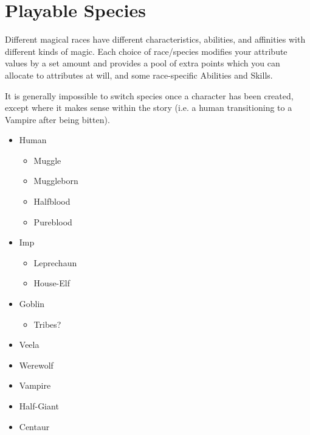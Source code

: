 
\chapter{Playable Species} \label{C:Species}
 
 Different magical races have different characteristics, abilities, and affinities with different kinds of magic. Each choice of race/species modifies your attribute values by a set amount and provides a pool of extra points which you can allocate to attributes at will, and some race-specific Abilities and Skills. 
 
It is generally impossible to switch species once a character has been created, except where it makes sense within the story (i.e. a human transitioning to a Vampire after being bitten). 

\begin{itemize}
	\item Human
	\begin{itemize}
		\item Muggle
		\item Muggleborn
		\item Halfblood
		\item Pureblood
	\end{itemize}
	\item Imp
	\begin{itemize}
		\item Leprechaun
		\item House-Elf
	\end{itemize}
	\item Goblin
	\begin{itemize}
		\item Tribes?
	\end{itemize}
	\item Veela
	\item Werewolf
	\item Vampire
	\item Half-Giant
	\item Centaur
\end{itemize}
